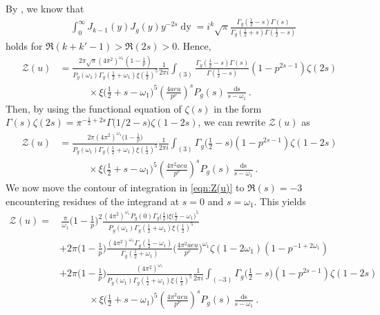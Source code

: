 \documentclass[12pt]{amsart}
\theoremstyle{plain}
\theoremstyle{definition}
\begin{document}
By \cite[p.~403]{Watson}, we know that
    \begin{align*}
    &\int_0^\infty 
    J_{k-1}(y) J_g(y) y^{-2s} \mathop{dy}
    = i^k \sqrt{\pi} 
    \frac{\Gamma_g(\frac12-s) \Gamma(s)}{\Gamma_g(\frac12+s) \Gamma(\frac12-s)} 
    \end{align*}
 holds for $\Re(k+k'-1)>\Re(2s) >0$. Hence,
    \begin{align*}
    \mathcal{Z}(u)
    &= 
    \frac{2\pi \sqrt{\pi} (4\pi^2)^{\omega_1} \left(1-\frac{1}{p}\right)}{P_g(\omega_1) \Gamma_g(\frac12+\omega_1) \xi(\frac12)^5} 
     \frac{1}{2\pi i} \int_{(3)} 
     \frac{\Gamma_g(\frac12-s) \Gamma(s)}{\Gamma(\frac12-s) }
     (1-p^{2s-1}) \zeta(2s) 
    \\
    &\hspace{3em} \times  \xi\Big(\frac12+s-\omega_1\Big)^5
    \left(\frac{4aeu}{p^\nu}\right)^{s}  P_g(s)  
    \frac{\mathop{ds}}{s-\omega_1} .
    \end{align*}
Then, by using the functional equation of $\zeta(s)$ in the form $ \displaystyle 
\Gamma(s)\zeta(2s)= \pi^{-\frac12+2s} \Gamma\big(1/2-s\big) \zeta(1-2s)$, we can rewrite $\mathcal{Z}(u)$ as 
    \begin{align}\label{eqn:Z(u)}
    \mathcal{Z}(u)
    &=
    \frac{2\pi(4\pi^2)^{\omega_1}  \big(1-\frac{1}{p}\big)}{P_g(\omega_1) \Gamma_g(\frac12+\omega_1) \xi(\frac12)^5} 
     \frac{1}{2\pi i} \int_{(3)} 
    \Gamma_g\Big(\frac12-s\Big)
     (1-p^{2s-1}) \zeta(1-2s)   \nonumber    \\
    &\hspace{3em} \times 
    \xi\Big(\frac12+s-\omega_1\Big)^5
   \left(\frac{4\pi^2aeu}{p^\nu}\right)^{s} 
  P_g(s)  
   \frac{\mathop{ds}}{s-\omega_1} .
    \end{align}
We now move the contour of integration in \eqref{eqn:Z(u)} to $\Re(s) =-3$ encountering residues of the integrand at $s=0$ and $s=\omega_1$. This yields
    \begin{equation}\label{eq:Zu-1}
    \begin{split}
    \mathcal{Z}(u)
    = &\, \frac{\pi}{\omega_1}    \Big(1-\frac{1}{p}\Big)^2
    \frac{(4\pi^2)^{\omega_1}P_g(0) \Gamma_g\big(\frac12\big)  \xi\big(\frac12-\omega_1\big)^5}{P_g(\omega_1) \Gamma_g(\frac12+\omega_1) \xi(\frac12)^5}  
     \\
    & + 2\pi   \Big(1-\frac{1}{p}\Big)
    \frac{(4\pi^2)^{\omega_1}\Gamma_g(\frac12-\omega_1)}{\Gamma_g(\frac12+\omega_1) } 
     \Big(\frac{4\pi^2 ae  u}{p^\nu}\Big)^{\omega_1} 
    \zeta(1-2\omega_1)  (1-p^{-1+2\omega_1})
    \\
    &+2\pi   \Big(1-\frac{1}{p}\Big)
    \frac{(4\pi^2)^{\omega_1}}{P_g(\omega_1) \Gamma_g(\frac12+\omega_1) \xi(\frac12)^5} 
     \frac{1}{2\pi i}  \int_{(-3)} 
    \Gamma_g\Big(\frac12-s\Big)
     (1-p^{2s-1}) \zeta(1-2s)       \\
    &\hspace{3em} \times 
    \xi\Big(\frac12+s-\omega_1\Big)^5
   \left(\frac{4\pi^2aeu}{p^\nu}\right)^{s} 
  P_g(s)  
   \frac{\mathop{ds}}{s-\omega_1}  .
    \end{split}
    \end{equation}
\end{document}
